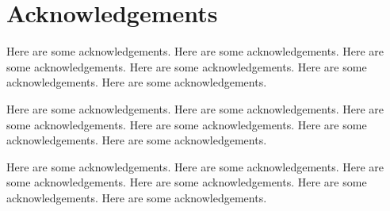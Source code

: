\section*{Acknowledgements}

Here are some acknowledgements. Here are some acknowledgements. Here are some acknowledgements. Here are some acknowledgements. Here are some acknowledgements. Here are some acknowledgements.

Here are some acknowledgements. Here are some acknowledgements. Here are some acknowledgements. Here are some acknowledgements. Here are some acknowledgements. Here are some acknowledgements.

Here are some acknowledgements. Here are some acknowledgements. Here are some acknowledgements. Here are some acknowledgements. Here are some acknowledgements. Here are some acknowledgements.
